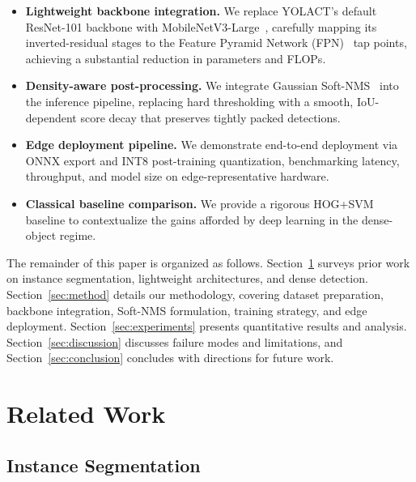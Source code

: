 \documentclass[conference]{IEEEtran}
\begin{document}
\begin{itemize}
  \item \textbf{Lightweight backbone integration.} We replace YOLACT's
        default ResNet-101 backbone with MobileNetV3-Large~\cite{howard2019mobilenetv3},
        carefully mapping its inverted-residual stages to the
        Feature Pyramid Network (FPN)~\cite{lin2017fpn} tap points,
        achieving a substantial reduction in parameters and FLOPs.
  \item \textbf{Density-aware post-processing.} We integrate Gaussian
        Soft-NMS~\cite{bodla2017soft} into the inference pipeline,
        replacing hard thresholding with a smooth, IoU-dependent score
        decay that preserves tightly packed detections.
  \item \textbf{Edge deployment pipeline.} We demonstrate end-to-end
        deployment via ONNX export and INT8 post-training quantization,
        benchmarking latency, throughput, and model size on
        edge-representative hardware.
  \item \textbf{Classical baseline comparison.} We provide a rigorous
        HOG+SVM baseline to contextualize the gains afforded by deep
        learning in the dense-object regime.
\end{itemize}

The remainder of this paper is organized as follows.
Section~\ref{sec:related} surveys prior work on instance segmentation,
lightweight architectures, and dense detection.
Section~\ref{sec:method} details our methodology, covering dataset
preparation, backbone integration, Soft-NMS formulation, training
strategy, and edge deployment. Section~\ref{sec:experiments} presents
quantitative results and analysis. Section~\ref{sec:discussion}
discusses failure modes and limitations, and Section~\ref{sec:conclusion}
concludes with directions for future work.

\section{Related Work}
\label{sec:related}

\subsection{Instance Segmentation}
\end{document}
